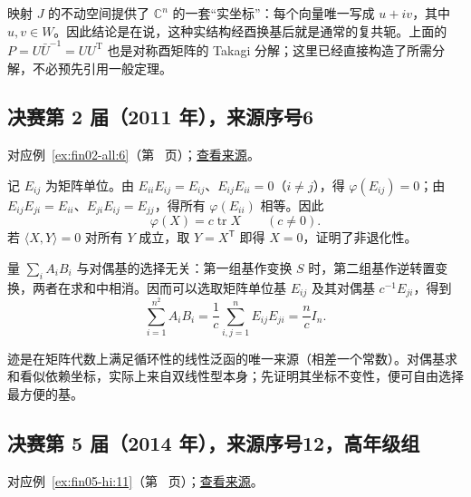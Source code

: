 \documentclass[12pt,fontset=fandol]{ctexart}
\begin{document}
\begin{remark}[方法与条件]

映射 $J$ 的不动空间提供了 $\mathbb C^n$ 的一套“实坐标”：每个向量唯一写成 $u+iv$，其中 $u,v\in W$。因此结论是在说，这种实结构经酉换基后就是通常的复共轭。上面的 $P=U\bar U^{-1}=UU^{\mathrm T}$ 也是对称酉矩阵的 Takagi 分解；这里已经直接构造了所需分解，不必预先引用一般定理。

\end{remark}

\subsection{决赛第 2 届（2011 年），来源序号6}\label{ans:fin02-all:6}\label{pr:fin02-all:6}

对应例~\ref{ex:fin02-all:6}（第~\pageref{ex:fin02-all:6} 页）；\href{https://github.com/lzxcr/cmc-mathematics/blob/64916fa1fdbc3e444a652eca204d5669058ee321/src/problems/finals/02/06.md}{查看来源}。

\begin{solve}

记 $E_{ij}$ 为矩阵单位。由
$E_{ii}E_{ij}=E_{ij}$、$E_{ij}E_{ii}=0$（$i\ne j$），得 $\varphi(E_{ij})=0$；由
$E_{ij}E_{ji}=E_{ii}$、$E_{ji}E_{ij}=E_{jj}$，得所有 $\varphi(E_{ii})$ 相等。因此
\[
\varphi(X)=c\operatorname{tr}X\qquad(c\ne0).
\]
若 $\langle X,Y\rangle=0$ 对所有 $Y$ 成立，取 $Y=X^{\mathsf T}$ 即得 $X=0$，证明了非退化性。

量 $\sum_iA_iB_i$ 与对偶基的选择无关：第一组基作变换 $S$ 时，第二组基作逆转置变换，两者在求和中相消。因而可以选取矩阵单位基 $E_{ij}$ 及其对偶基 $c^{-1}E_{ji}$，得到
\[
\sum_{i=1}^{n^2}A_iB_i
=\frac1c\sum_{i,j=1}^n E_{ij}E_{ji}
=\frac nc I_n.
\]

\end{solve}

\begin{remark}[方法与条件]

迹是在矩阵代数上满足循环性的线性泛函的唯一来源（相差一个常数）。对偶基求和看似依赖坐标，实际上来自双线性型本身；先证明其坐标不变性，便可自由选择最方便的基。

\end{remark}

\subsection{决赛第 5 届（2014 年），来源序号12，高年级组}\label{ans:fin05-hi:11}\label{pr:fin05-hi:11}

对应例~\ref{ex:fin05-hi:11}（第~\pageref{ex:fin05-hi:11} 页）；\href{https://github.com/lzxcr/cmc-mathematics/blob/64916fa1fdbc3e444a652eca204d5669058ee321/src/problems/finals/05/12.md}{查看来源}。
\end{document}
